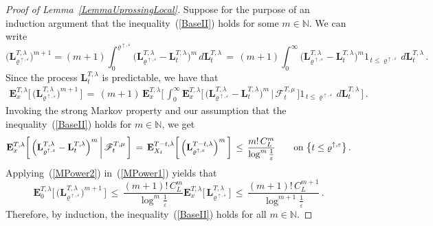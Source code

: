 \documentclass[10pt]{article}
\numberwithin{equation}{section}
\theoremstyle{definition}
\begin{document}
\begin{proof}[Proof of Lemma~\ref{LemmaUprossingLocal}]
Suppose for the purpose of an induction argument that the inequality~(\ref{BaseII}) holds for some $m\in \mathbb{N}$.  We can write 
$$\Big(\mathbf{L}_{\varrho^{\uparrow, \varepsilon} }^{T,\lambda}\Big)^{m+1} =(m+1)\int_0^{\varrho^{\uparrow, \varepsilon} } \Big(\mathbf{L}_{\varrho^{\uparrow, \varepsilon}}^{T,\lambda}-\mathbf{L}_{t}^{T,\lambda}\Big)^{m}\,d\mathbf{L}_{t }^{T,\lambda} \,=\,(m+1)\int_0^{\infty } \Big(\mathbf{L}_{\varrho^{\uparrow, \varepsilon}}^{T,\lambda}-\mathbf{L}_{t}^{T,\lambda}\Big)^{m}1_{\,t\leq \varrho^{\uparrow, \varepsilon}  }\,d\mathbf{L}_{t }^{T,\lambda} \,. $$  
Since the process $\mathbf{L}_{t }^{T,\lambda} $ is predictable, we have that
\begin{align}\label{MPower1}
    \mathbf{E}^{T,\lambda}_{x}\bigg[\,\Big(\mathbf{L}_{\varrho^{\uparrow, \varepsilon} }^{T,\lambda}\Big)^{m+1}\,\bigg]\,=\,(m+1)\,\mathbf{E}^{T,\lambda}_{x}\bigg[\,\int_0^{\infty }\mathbf{E}^{T,\lambda}_{x}\bigg[\,\Big(\mathbf{L}_{\varrho^{\uparrow, \varepsilon}}^{T,\lambda}-\mathbf{L}_{t}^{T,\lambda}\Big)^{m}\,\bigg|\,  \mathscr{F}_t^{T,\mu}\, \bigg]1_{\,t\leq \varrho^{\uparrow, \varepsilon}  }\,d\mathbf{L}_{t }^{T,\lambda}\,\bigg]\,. 
\end{align}
Invoking the strong Markov property and our assumption that the inequality~(\ref{BaseII}) holds for  $m\in \mathbb{N}$, we get
\begin{align}\label{MPower2}
    \mathbf{E}^{T,\lambda}_{x}\bigg[\,\Big(\mathbf{L}_{\varrho^{\uparrow, \varepsilon}}^{T,\lambda}-\mathbf{L}_{t}^{T,\lambda}\Big)^{m}\,\bigg|\,  \mathscr{F}_t^{T,\mu} \,\bigg]\,=\,\mathbf{E}^{T-t,\lambda}_{X_{t}}\bigg[\,\Big(\mathbf{L}_{\varrho^{\uparrow, \varepsilon}}^{T-t,\lambda}\Big)^{m} \,\bigg]\,\leq \, \frac{ m!\, C_L^m  }{\log^m \frac{1}{\varepsilon} }  \hspace{.7cm} \text{on} \,\, \big\{ t\leq  \varrho^{\uparrow, \varepsilon}\big\}    \,.
\end{align}
Applying~(\ref{MPower2}) in~(\ref{MPower1}) yields that
$$   \mathbf{E}^{T,\lambda}_{0}\bigg[\,\Big(\mathbf{L}_{\varrho^{\uparrow, \varepsilon} }^{T,\lambda}\Big)^{m+1}\,\bigg]\,\leq \, \frac{ (m+1)!\, C_L^m  }{\log^m \frac{1}{\varepsilon} }  \mathbf{E}^{T,\lambda}_{x}\Big[\,\mathbf{L}_{\varrho^{\uparrow, \varepsilon} }^{T,\lambda}\,\Big]\,\leq \, \frac{  (m+1)!\,C_L^{m+1}  }{\log^{m+1} \frac{1}{\varepsilon} }   \,. $$
Therefore, by induction, the inequality~(\ref{BaseII}) holds for all $m\in \mathbb{N}$. \vspace{.3cm}


\end{proof}
\end{document}
